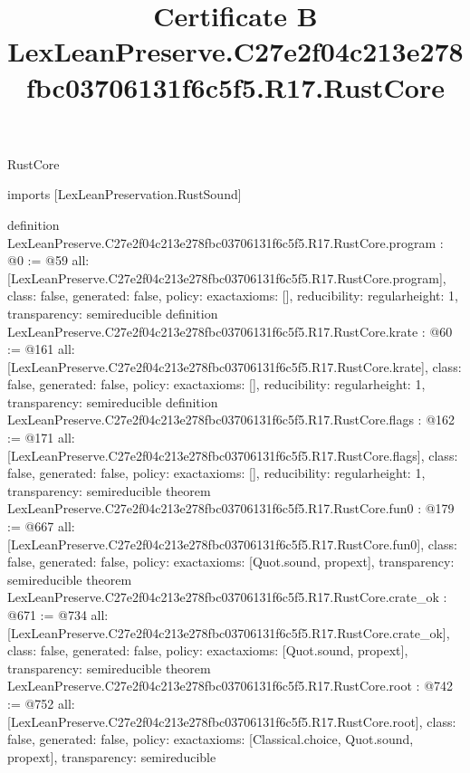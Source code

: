 \begin{lexlean}{RustCore}
\title{Certificate B LexLeanPreserve.C27e2f04c213e278fbc03706131f6c5f5.R17.RustCore}
\begin{coremodule}
imports [LexLeanPreservation.RustSound]

definition LexLeanPreserve.C27e2f04c213e278fbc03706131f6c5f5.R17.RustCore.program : @0 := @59 {
  all: [LexLeanPreserve.C27e2f04c213e278fbc03706131f6c5f5.R17.RustCore.program],
  class: false,
  generated: false,
  policy: exact{axioms: []},
  reducibility: regular{height: 1},
  transparency: semireducible
}
definition LexLeanPreserve.C27e2f04c213e278fbc03706131f6c5f5.R17.RustCore.krate : @60 := @161 {
  all: [LexLeanPreserve.C27e2f04c213e278fbc03706131f6c5f5.R17.RustCore.krate],
  class: false,
  generated: false,
  policy: exact{axioms: []},
  reducibility: regular{height: 1},
  transparency: semireducible
}
definition LexLeanPreserve.C27e2f04c213e278fbc03706131f6c5f5.R17.RustCore.flags : @162 := @171 {
  all: [LexLeanPreserve.C27e2f04c213e278fbc03706131f6c5f5.R17.RustCore.flags],
  class: false,
  generated: false,
  policy: exact{axioms: []},
  reducibility: regular{height: 1},
  transparency: semireducible
}
theorem LexLeanPreserve.C27e2f04c213e278fbc03706131f6c5f5.R17.RustCore.fun0 : @179 := @667 {
  all: [LexLeanPreserve.C27e2f04c213e278fbc03706131f6c5f5.R17.RustCore.fun0],
  class: false,
  generated: false,
  policy: exact{axioms: [Quot.sound, propext]},
  transparency: semireducible
}
theorem LexLeanPreserve.C27e2f04c213e278fbc03706131f6c5f5.R17.RustCore.crate_ok : @671 := @734 {
  all: [LexLeanPreserve.C27e2f04c213e278fbc03706131f6c5f5.R17.RustCore.crate_ok],
  class: false,
  generated: false,
  policy: exact{axioms: [Quot.sound, propext]},
  transparency: semireducible
}
theorem LexLeanPreserve.C27e2f04c213e278fbc03706131f6c5f5.R17.RustCore.root : @742 := @752 {
  all: [LexLeanPreserve.C27e2f04c213e278fbc03706131f6c5f5.R17.RustCore.root],
  class: false,
  generated: false,
  policy: exact{axioms: [Classical.choice, Quot.sound, propext]},
  transparency: semireducible
}


\end{coremodule}
\end{lexlean}
